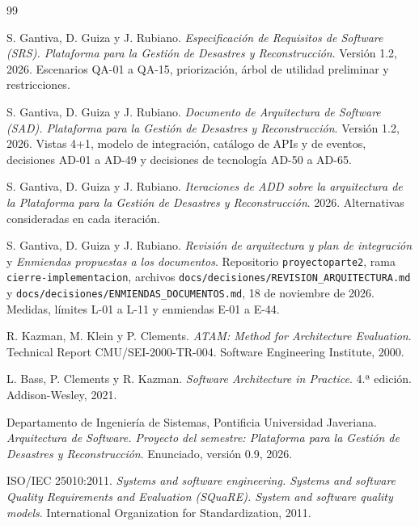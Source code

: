 \documentclass[11pt,letterpaper]{article}
\begin{document}
\begingroup
\renewcommand{\section}[2]{}
\begin{thebibliography}{99}

S. Gantiva, D. Guiza y J. Rubiano. \textit{Especificación de Requisitos de Software (SRS).
Plataforma para la Gestión de Desastres y Reconstrucción}. Versión 1.2, 2026. Escenarios QA-01 a
QA-15, priorización, árbol de utilidad preliminar y restricciones.

S. Gantiva, D. Guiza y J. Rubiano. \textit{Documento de Arquitectura de Software (SAD). Plataforma
para la Gestión de Desastres y Reconstrucción}. Versión 1.2, 2026. Vistas 4+1, modelo de
integración, catálogo de APIs y de eventos, decisiones AD-01 a AD-49 y decisiones de tecnología
AD-50 a AD-65.

S. Gantiva, D. Guiza y J. Rubiano. \textit{Iteraciones de ADD sobre la arquitectura de la
Plataforma para la Gestión de Desastres y Reconstrucción}. 2026. Alternativas consideradas en cada
iteración.

S. Gantiva, D. Guiza y J. Rubiano. \textit{Revisión de arquitectura y plan de integración} y
\textit{Enmiendas propuestas a los documentos}. Repositorio \texttt{proyectoparte2}, rama
\texttt{cierre-implementacion}, archivos \texttt{docs/decisiones/REVISION\_ARQUITECTURA.md} y
\texttt{docs/decisiones/ENMIENDAS\_DOCUMENTOS.md}, 18 de noviembre de 2026. Medidas, límites L-01 a
L-11 y enmiendas E-01 a E-44.

R. Kazman, M. Klein y P. Clements. \textit{ATAM: Method for Architecture Evaluation}. Technical
Report CMU/SEI-2000-TR-004. Software Engineering Institute, 2000.

L. Bass, P. Clements y R. Kazman. \textit{Software Architecture in Practice}. 4.ª edición.
Addison-Wesley, 2021.

Departamento de Ingeniería de Sistemas, Pontificia Universidad Javeriana. \textit{Arquitectura de
Software. Proyecto del semestre: Plataforma para la Gestión de Desastres y Reconstrucción}.
Enunciado, versión 0.9, 2026.

ISO/IEC 25010:2011. \textit{Systems and software engineering. Systems and software Quality
Requirements and Evaluation (SQuaRE). System and software quality models}. International
Organization for Standardization, 2011.


\end{thebibliography}
\end{document}
